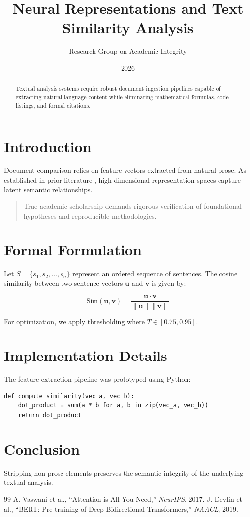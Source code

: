 \documentclass{article}
\title{Neural Representations and Text Similarity Analysis}
\author{Research Group on Academic Integrity}
\date{2026}
\begin{document}
\maketitle

\begin{abstract}
Textual analysis systems require robust document ingestion pipelines capable of extracting natural language content while eliminating mathematical formulas, code listings, and formal citations.
\end{abstract}

\section{Introduction}
Document comparison relies on feature vectors extracted from natural prose. As established in prior literature \cite{vaswani2017attention, devlin2019bert}, high-dimensional representation spaces capture latent semantic relationships.

\begin{quote}
True academic scholarship demands rigorous verification of foundational hypotheses and reproducible methodologies.
\end{quote}

\section{Formal Formulation}
Let $S = \{s_1, s_2, \dots, s_n\}$ represent an ordered sequence of sentences. The cosine similarity between two sentence vectors $\mathbf{u}$ and $\mathbf{v}$ is given by:

\begin{equation}
\text{Sim}(\mathbf{u}, \mathbf{v}) = \frac{\mathbf{u} \cdot \mathbf{v}}{\|\mathbf{u}\| \|\mathbf{v}\|}
\end{equation}

For optimization, we apply thresholding where $T \in [0.75, 0.95]$.

\section{Implementation Details}
The feature extraction pipeline was prototyped using Python:

\begin{verbatim}
def compute_similarity(vec_a, vec_b):
    dot_product = sum(a * b for a, b in zip(vec_a, vec_b))
    return dot_product
\end{verbatim}

\section{Conclusion}
Stripping non-prose elements preserves the semantic integrity of the underlying textual analysis.

\begin{thebibliography}{99}
 A. Vaswani et al., ``Attention is All You Need,'' \textit{NeurIPS}, 2017.
 J. Devlin et al., ``BERT: Pre-training of Deep Bidirectional Transformers,'' \textit{NAACL}, 2019.
\end{thebibliography}
\end{document}
